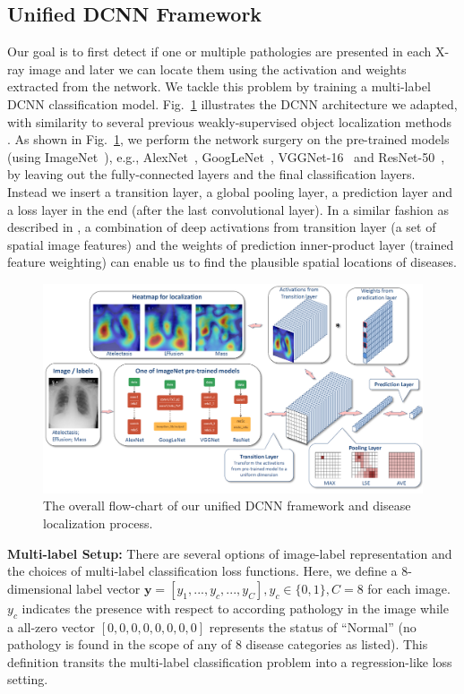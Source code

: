 \documentclass[10pt,twocolumn,letterpaper]{article}
\begin{document}
\subsection{Unified DCNN Framework}
Our goal is to first detect if one or multiple pathologies are presented in each X-ray image and later we can locate them using the activation and weights extracted from the network. We tackle this problem by training a multi-label DCNN classification model. Fig.~\ref{fig:CNN_Arch} illustrates the DCNN architecture we adapted, with similarity to several previous weakly-supervised object localization methods \cite{oquab2015object,zhou2015learning,durandweldon,Hwang2016Self}. As shown in Fig.~\ref{fig:CNN_Arch}, we perform the network surgery on the pre-trained models (using ImageNet~\cite{deng2009imagenet,russakovsky2015imagenet}), e.g., AlexNet~\cite{krizhevsky2012imagenet}, GoogLeNet~\cite{szegedy2015going}, VGGNet-16~\cite{simonyan2014very} and ResNet-50~\cite{He2015}, by leaving out the fully-connected layers and the final classification layers. Instead we insert a transition layer, a global pooling layer, a prediction layer and a loss layer in the end (after the last convolutional layer). In a similar fashion as described in \cite{zhou2015learning}, a combination of deep activations from transition layer (a set of spatial image features) and the weights of prediction inner-product layer (trained feature weighting) can enable us to find the plausible spatial locations of diseases.

\begin{figure}[t]
	\includegraphics[width=1.0\linewidth]{cnnFramework.png}
	\caption{The overall flow-chart of our unified DCNN framework and disease localization process.}
	\label{fig:CNN_Arch}
\end{figure}

{\bf Multi-label Setup:}
 There are several options of image-label representation and the choices of multi-label classification loss functions. Here, we define a 8-dimensional label vector $\textbf{y} = [y_{1},...,y_{c},...,y_{C}], y_{c}\in\{0,1\}, C=8$ for each image. $y_{c}$ indicates the presence with respect to according pathology in the image while a all-zero vector $[0,0,0,0,0,0,0,0]$ represents the status of ``Normal'' (no pathology is found in the scope of any of 8 disease categories as listed). This definition transits the multi-label classification problem into a regression-like loss setting. 
\end{document}
